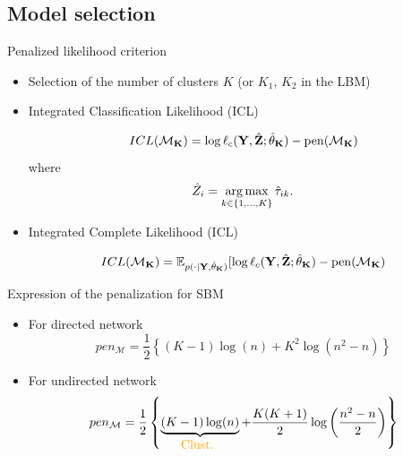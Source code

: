 \documentclass[compress,10pt]{beamer}
\begin{document}
 \subsection{Model selection}
 \begin{frame}{ Penalized likelihood criterion}

 \begin{itemize}
 \item  Selection of the number of clusters  $K$ (or $K_1$, $K_2$ in the LBM)
\item   Integrated Classification Likelihood (ICL)   \textcolor{mygreen}{\cite{biernacki2000assessing}}
 

\begin{equation}\label{eq:ICL}
ICL(\mathcal{M}_{\mathbf{K}}) =\log  \ell_c(\mathbf{Y},\hat{\mathbf{Z}}; \hat \theta_{\mathbf{K}})-  \mathrm{pen}(\mathcal{M}_{\mathbf{K}})
\end{equation}
 where  \begin{equation}\label{eq:Zhat}
\hat{Z}_i = \operatorname*{arg\,max}_{k \in \{1, \dots, K\}}  \hat{\tau}_{ik}. 
\end{equation} 
\item   Integrated Complete Likelihood (ICL)  %

 

\begin{equation}\label{eq:ICL}
ICL(\mathcal{M}_{\mathbf{K}}) =\mathbb{E}_{p(\cdot | \mathbf{Y}, \hat \theta_{\mathbf{K}})}[\log  \ell_c(\mathbf{Y},\hat{\mathbf{Z}}; \hat \theta_{\mathbf{K}})-  \mathrm{pen}(\mathcal{M}_{\mathbf{K}})
\end{equation}
 \end{itemize}

\end{frame}


 \begin{frame}{Expression of the penalization for SBM}
 
 
\begin{itemize}
 \item For directed network 
 $$ pen_{\mathcal{M}} =
 \frac{1}{2}\left\{ (K-1)\log(n)  +K^2   \log \left( n^2-n \right)\right\} 
$$ 


 \item For undirected network 
$$ pen_{\mathcal{M}} =  \frac{1}{2}\left\{ \underbrace{(K-1)\log(n) }_{\mbox{\textcolor{dgreen}{Clust. }}}  +  \frac{K(K+1)}{2}   \log \left(\frac{ n^2-n }{2}\right)\right\} $$


\end{itemize}
\end{frame}
\end{document}

